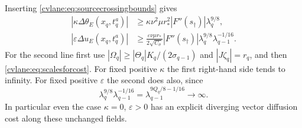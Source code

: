 Inserting \eqref{cvlane:eq:sourcecrossingbounds} gives
\begin{align}
 |\kappa\Delta\theta_E(x_q,t_q^a)|
 &\geq\kappa\nu^2\mu r_*^2
 |F''(s_\dagger)|\lambda_q^{9/8},\label{cvlane:eq:scalarcostlower}\\
 |\varepsilon\Delta u_E(x_q,t_q^a)|
 &\geq\frac{\varepsilon\nu\mu r_*}{2\sqrt{C_\sigma}}
 |F''(s_\dagger)|\lambda_q^{9/8}
 \lambda_{q-1}^{-1/16}.
 \label{cvlane:eq:velocitycostlower}
\end{align}
For the second line first use
$|\Omega_q|\geq |\Theta_q|K_q/(2\sigma_{q-1})$ and
$|J\zeta_q|=r_q$, and then \eqref{cvlane:eq:scalesforcost}.
For fixed positive $\kappa$ the first right-hand side tends
to infinity. For fixed positive $\varepsilon$ the second
does also, since
\[
 \lambda_q^{9/8}\lambda_{q-1}^{-1/16}
 =\lambda_{q-1}^{9Q_q/8-1/16}\longrightarrow\infty.
\]
In particular even the case $\kappa=0$, $\varepsilon>0$
has an explicit diverging vector diffusion cost along these
unchanged fields.

